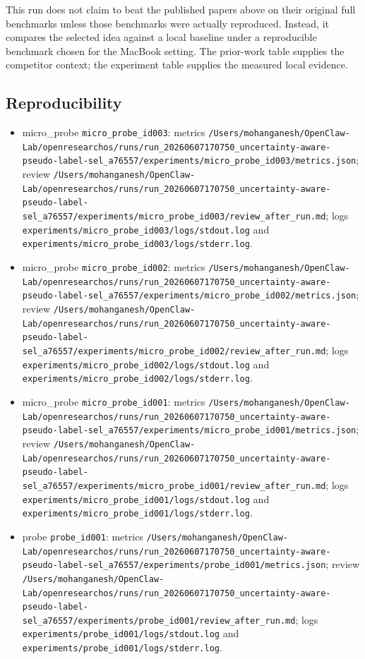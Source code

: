 \documentclass[
  11pt,
]{article}
\providecommand{\tightlist}{%
  \setlength{\itemsep}{0pt}\setlength{\parskip}{0pt}}
\begin{document}
This run does not claim to beat the published papers above on their original full benchmarks unless those benchmarks were actually reproduced. Instead, it compares the selected idea against a local baseline under a reproducible benchmark chosen for the MacBook setting. The prior-work table supplies the competitor context; the experiment table supplies the measured local evidence.

\subsection{Reproducibility}\label{reproducibility}

\begin{itemize}
\tightlist
\item
  micro\_probe \texttt{micro\_probe\_id003}: metrics \texttt{/Users/mohanganesh/OpenClaw-Lab/openresearchos/runs/run\_20260607170750\_uncertainty-aware-pseudo-label-sel\_a76557/experiments/micro\_probe\_id003/metrics.json}; review \texttt{/Users/mohanganesh/OpenClaw-Lab/openresearchos/runs/run\_20260607170750\_uncertainty-aware-pseudo-label-sel\_a76557/experiments/micro\_probe\_id003/review\_after\_run.md}; logs \texttt{experiments/micro\_probe\_id003/logs/stdout.log} and \texttt{experiments/micro\_probe\_id003/logs/stderr.log}.
\item
  micro\_probe \texttt{micro\_probe\_id002}: metrics \texttt{/Users/mohanganesh/OpenClaw-Lab/openresearchos/runs/run\_20260607170750\_uncertainty-aware-pseudo-label-sel\_a76557/experiments/micro\_probe\_id002/metrics.json}; review \texttt{/Users/mohanganesh/OpenClaw-Lab/openresearchos/runs/run\_20260607170750\_uncertainty-aware-pseudo-label-sel\_a76557/experiments/micro\_probe\_id002/review\_after\_run.md}; logs \texttt{experiments/micro\_probe\_id002/logs/stdout.log} and \texttt{experiments/micro\_probe\_id002/logs/stderr.log}.
\item
  micro\_probe \texttt{micro\_probe\_id001}: metrics \texttt{/Users/mohanganesh/OpenClaw-Lab/openresearchos/runs/run\_20260607170750\_uncertainty-aware-pseudo-label-sel\_a76557/experiments/micro\_probe\_id001/metrics.json}; review \texttt{/Users/mohanganesh/OpenClaw-Lab/openresearchos/runs/run\_20260607170750\_uncertainty-aware-pseudo-label-sel\_a76557/experiments/micro\_probe\_id001/review\_after\_run.md}; logs \texttt{experiments/micro\_probe\_id001/logs/stdout.log} and \texttt{experiments/micro\_probe\_id001/logs/stderr.log}.
\item
  probe \texttt{probe\_id001}: metrics \texttt{/Users/mohanganesh/OpenClaw-Lab/openresearchos/runs/run\_20260607170750\_uncertainty-aware-pseudo-label-sel\_a76557/experiments/probe\_id001/metrics.json}; review \texttt{/Users/mohanganesh/OpenClaw-Lab/openresearchos/runs/run\_20260607170750\_uncertainty-aware-pseudo-label-sel\_a76557/experiments/probe\_id001/review\_after\_run.md}; logs \texttt{experiments/probe\_id001/logs/stdout.log} and \texttt{experiments/probe\_id001/logs/stderr.log}.

\end{itemize}
\end{document}

